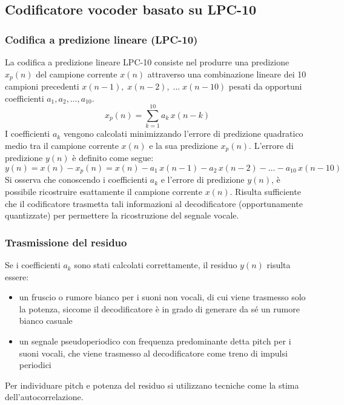 \subsection{Codificatore vocoder basato su LPC-10}
\subsubsection*{Codifica a predizione lineare (LPC-10)}
La codifica a predizione lineare LPC-10 consiste nel produrre una predizione \(x_p(n)\) del campione corrente \(x(n)\)
attraverso una combinazione lineare dei 10 campioni precedenti \(x(n\!-\!1), \; x(n\!-\!2), \; \dots \; x(n\!-\!10)\)
pesati da opportuni coefficienti \(a_1, a_2, \dots, a_{10}\).
\[x_p(n) = \sum_{k=1}^{10} a_k \, x(n-k)\]
I coefficienti \(a_k\) vengono calcolati minimizzando l'errore di predizione quadratico medio tra il campione
corrente \(x(n)\) e la sua predizione \(x_p(n)\). L'errore di predizione \(y(n)\) è definito come segue:
\[y(n) = x(n) - x_p(n) = x(n) - a_1 \, x(n-1) - a_2 \, x(n-2) - \dots - a_{10} \, x(n-10)\]
Si osserva che conoscendo i coefficienti \(a_k\) e l'errore di predizione \(y(n)\), è possibile ricostruire esattamente
il campione corrente \(x(n)\). Risulta sufficiente che il codificatore trasmetta tali informazioni al decodificatore
(opportunamente quantizzate) per permettere la ricostruzione del segnale vocale.

\subsubsection*{Trasmissione del residuo}
Se i coefficienti \(a_k\) sono stati calcolati correttamente, il residuo \(y(n)\) risulta essere:
\begin{itemize}
	\item un fruscio o rumore bianco per i suoni non vocali, di cui viene trasmesso solo la potenza, siccome il
	decodificatore è in grado di generare da sé un rumore bianco casuale
	\item un segnale pseudoperiodico con frequenza predominante detta pitch per i suoni vocali, che viene trasmesso
	al decodificatore come treno di impulsi periodici
\end{itemize}
Per individuare pitch e potenza del residuo si utilizzano tecniche come la stima dell'autocorrelazione.

